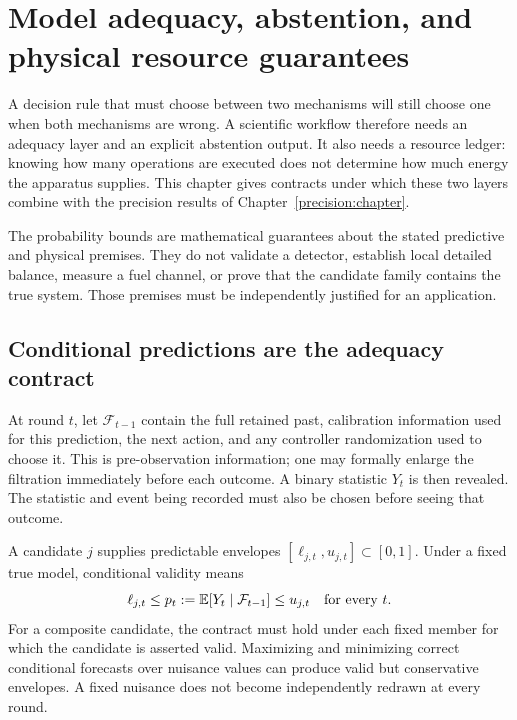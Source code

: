\chapter[Model adequacy and physical resources]{Model adequacy, abstention, and physical resource guarantees}
\label{adequacy:chapter}

A decision rule that must choose between two mechanisms will still choose one
when both mechanisms are wrong. A scientific workflow therefore needs an
adequacy layer and an explicit abstention output. It also needs a resource ledger:
knowing how many operations are executed does not determine how much energy the
apparatus supplies. This chapter gives contracts under which these two layers
combine with the precision results of Chapter~\ref{precision:chapter}.

The probability bounds are mathematical guarantees about the stated predictive
and physical premises. They do not validate a detector, establish local detailed
balance, measure a fuel channel, or prove that the candidate family contains the
true system. Those premises must be independently justified for an application.

\section{Conditional predictions are the adequacy contract}

At round $t$, let $\mathcal F_{t-1}$ contain the full retained past, calibration
information used for this prediction, the next action, and any controller
randomization used to choose it. This is pre-observation information; one may
formally enlarge the filtration immediately before each outcome. A binary
statistic $Y_t$ is then revealed. The statistic and event being recorded must
also be chosen before seeing that outcome.

A candidate $j$ supplies predictable envelopes
$[\ell_{j,t},u_{j,t}]\subset[0,1]$. Under a fixed true model, conditional validity
means
\begin{equation}
 \ell_{j,t}\leq p_t:=\mathbb E[Y_t\mid\mathcal F_{t-1}]
       \leq u_{j,t}\quad\hbox{for every }t.
 \label{adequacy:conditional}
\end{equation}
For a composite candidate, the contract must hold under each fixed member for
which the candidate is asserted valid. Maximizing and minimizing correct
conditional forecasts over nuisance values can produce valid but conservative
envelopes. A fixed nuisance does not become independently redrawn at every round.

